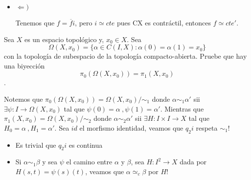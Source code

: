 \documentclass[11pt]{article}
\newenvironment{proof}[1][Demostraci\'on]{\begin{trivlist}
\item[\hskip \labelsep {\bfseries #1}]}{\end{trivlist}}
\begin{document}
\begin{enumerate}
\begin{proof}
\begin{enumerate}
\begin{itemize}
\begin{itemize}
\end{itemize}

Entonces $\exists ! \overline{H}:CX \rightarrow Y$ dada por $\overline{H}(\overline{(x,t)})=H(x,t)$, por ende $\overline{f}:\overline{H}(\overline{(x,0)})=H(x,0)=f$ y entonces $\overline{f}i=f$ y $\overline{f}|_i(X)=f$

\item {$\Longleftarrow)$}

Tenemos que $f=\overline{f}i$, pero $i \simeq cte$ pues CX es contr\'actil, entonces $f \simeq cte'$.

\end{itemize}

\end{enumerate}

\end{proof}



\bigskip

\hspace{-17pt}{\bfseries El grupo fundamental}


\item Sea $X$ es un espacio topol\'ogico y, $x_0\in X$. Sea $$\Omega(X,x_0)=\{\alpha\in
C(I,X):\alpha(0)=\alpha(1)=x_0\}$$ con la topolog\'ia de subespacio
de la topolog\'ia compacto-abierta. Pruebe que hay una biyecci\'on 
$$\pi_0(\Omega(X,x_0))=\pi_1(X,x_0)$$.

\begin{proof}

Notemos que $\pi_0(\Omega(X,x_0))=\Omega(X,x_0)/\mathord \sim_1$ donde $\alpha \sim_1 \alpha'$ sii $\exists \psi : I \rightarrow \Omega(X,x_0)$ tal que $\psi(0)=\alpha \ , \psi(1)=\alpha'$. Mientras que $\pi_1(X,x_0) = \Omega(X,x_0)/\mathord \sim_2$ donde $\alpha \sim_2 \alpha'$ sii $\exists H : I \times I \rightarrow X$ tal que $H_0=\alpha \ , H_1=\alpha'$. Sea $id$ el morfismo identidad, veamos que $q_2i$ respeta $\sim_1 $!

\begin{itemize}
\item Es trivial que $q_2i$ es continua
\item Si $\alpha \sim_1 \beta$ y sea $\psi$ el camino entre $\alpha$ y $\beta$, sea $H: I^2 \rightarrow X$ dada por $H(s,t)=\psi(s)(t)$, veamos que $\alpha \simeq_c \beta$ por $H$!


\end{itemize}
\end{proof}
\end{enumerate}
\end{document}
